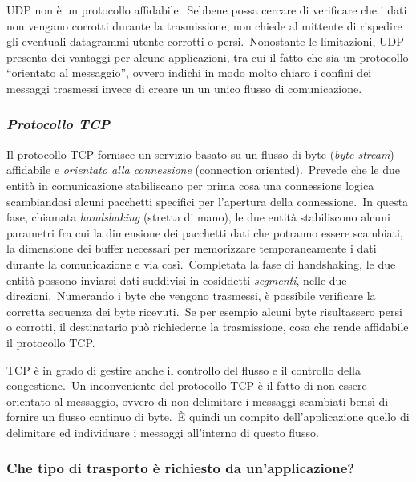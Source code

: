 UDP non è un protocollo affidabile.\
Sebbene possa cercare di verificare che i dati non vengano corrotti durante la trasmissione, non chiede al mittente di rispedire gli eventuali datagrammi utente corrotti o persi.\
Nonostante le limitazioni, UDP presenta dei vantaggi per alcune applicazioni, tra cui il fatto che sia un protocollo ``orientato al messaggio'', ovvero indichi in modo molto chiaro i confini dei messaggi trasmessi invece di creare un un unico flusso di comunicazione.

\subsubsection{\emph{Protocollo TCP}}

Il protocollo TCP fornisce un servizio basato su un flusso di byte (\emph{byte-stream}) affidabile e \emph{orientato alla connessione} (connection oriented).\
Prevede che le due entità in comunicazione stabiliscano per prima cosa una connessione logica scambiandosi alcuni pacchetti specifici per l'apertura della connessione.\
In questa fase, chiamata \emph{handshaking} (stretta di mano), le due entità stabiliscono alcuni parametri fra cui la dimensione dei pacchetti dati che potranno essere scambiati, la dimensione dei buffer necessari per memorizzare temporaneamente i dati durante la comunicazione e via così.\
Completata la fase di handshaking, le due entità possono inviarsi dati suddivisi in cosiddetti \emph{segmenti}, nelle due direzioni.\
Numerando i byte che vengono trasmessi, è possibile verificare la corretta sequenza dei byte ricevuti.\
Se per esempio alcuni byte risultassero persi o corrotti, il destinatario può richiederne la trasmissione, cosa che rende affidabile il protocollo TCP.

TCP è in grado di gestire anche il controllo del flusso e il controllo della congestione.\
Un inconveniente del protocollo TCP è il fatto di non essere orientato al messaggio, ovvero di non delimitare i messaggi scambiati bensì di fornire un flusso continuo di byte.\
È quindi un compito dell'applicazione quello di delimitare ed individuare i messaggi all'interno di questo flusso.

\subsubsection{Che tipo di trasporto è richiesto da un'applicazione?}

